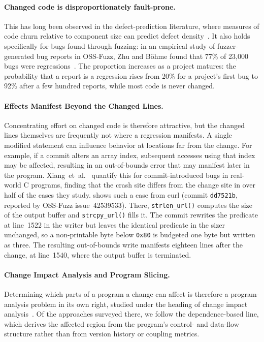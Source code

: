 \paragraph{Changed code is disproportionately fault-prone.}
This has long been observed in the defect-prediction literature, where measures
of code churn relative to component size can predict defect
density~\cite{nagappanUseRelativeCode2005}. It also holds specifically for bugs
found through fuzzing: in an empirical study of fuzzer-generated bug reports in
OSS-Fuzz, Zhu and Böhme found that 77\% of 23{,}000 bugs were
regressions~\cite{zhuRegressionGreyboxFuzzing2021b}. The proportion increases as
a project matures: the probability that a report is a regression rises from 20\%
for a project's first bug to 92\% after a few hundred reports, while most code
is never changed.



\paragraph{Effects Manifest Beyond the Changed Lines.}
Concentrating effort on changed code is therefore attractive, but the changed
lines themselves are frequently not where a regression manifests. A single
modified statement can influence behavior at locations far from the change. For
example, if a commit alters an array index, subsequent accesses using that index
may be affected, resulting in an out-of-bounds error that may manifest later in
the program. Xiang~et~al.~\cite{xiangCriticalCodeGuided2024} quantify this for
commit-introduced bugs in real-world C programs, finding that the crash site
differs from the change site in over half of the cases they study.
 shows such a case from curl (commit \texttt{dd7521b}, reported
by OSS-Fuzz issue~42539533). There, \texttt{strlen\_url()} computes the size of
the output buffer and \texttt{strcpy\_url()} fills it. The commit rewrites the
predicate at line~1522 in the writer but leaves the identical predicate in the
sizer unchanged, so a non-printable byte below \texttt{0x80} is budgeted one
byte but written as three. The resulting out-of-bounds write manifests eighteen
lines after the change, at line~1540, where the output buffer is terminated.

\paragraph{Change Impact Analysis and Program Slicing.}
Determining which parts of a program a change can affect is therefore a
program-analysis problem in its own right, studied under the heading of change
impact analysis~\cite{kretsouChangeImpactAnalysis2021}. Of the approaches
surveyed there, we follow the dependence-based line, which derives the affected
region from the program's control- and data-flow structure rather than from
version history or coupling metrics.

